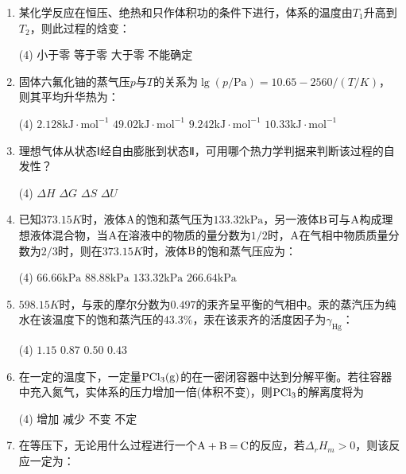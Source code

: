 \begin{enumerate}[label=\arabic*., itemsep=1.5ex]
    \item 某化学反应在恒压、绝热和只作体积功的条件下进行，体系的温度由$T_1$升高到$T_2$，则此过程的焓变：
    \begin{tasks}(4)
        \task 小于零
        \task 等于零
        \task 大于零
        \task 不能确定
    \end{tasks}
    \item 固体六氟化铀的蒸气压$p$与$T$的关系为$\lg(p/\mathrm{Pa})=10.65-2560/(T/K)$，则其平均升华热为：
    \begin{tasks}(4)
        \task $2.128\mathrm{kJ\cdot mol^{-1}}$
        \task $49.02\mathrm{kJ\cdot mol^{-1}}$
        \task $9.242\mathrm{kJ\cdot mol^{-1}}$
        \task $10.33\mathrm{kJ\cdot mol^{-1}}$
    \end{tasks}
    \item 理想气体从状态Ⅰ经自由膨胀到状态Ⅱ，可用哪个热力学判据来判断该过程的自发性？
    \begin{tasks}(4)
        \task $\Delta H$
        \task $\Delta G$
        \task $\Delta S$
        \task $\Delta U$
    \end{tasks}
    \item 已知$373.15K$时，液体$\ce{A}$的饱和蒸气压为$133.32\mathrm{kPa}$，另一液体$\ce{B}$可与$\ce{A}$构成理想液体混合物，当$\ce{A}$在溶液中的物质的量分数为$1/2$时，$\ce{A}$在气相中物质质量分数为$2/3$时，则在$373.15K$时，液体$\ce{B}$的饱和蒸气压应为：
    \begin{tasks}(4)
        \task $66.66\mathrm{kPa}$
        \task $88.88\mathrm{kPa}$
        \task $133.32\mathrm{kPa}$
        \task $266.64\mathrm{kPa}$
    \end{tasks}
    \item $598.15K$时，与汞的摩尔分数为$0.497$的汞齐呈平衡的气相中。汞的蒸汽压为纯水在该温度下的饱和蒸汽压的$43.3\%$，汞在该汞齐的活度因子为$\gamma_{\mathrm{Hg}}$：
    \begin{tasks}(4)
        \task $1.15$
        \task $0.87$
        \task $0.50$
        \task $0.43$
    \end{tasks}
    \item 在一定的温度下，一定量$\ce{PCl_{3}(g)}$的在一密闭容器中达到分解平衡。若往容器中充入氮气，实体系的压力增加一倍(体积不变)，则$\ce{PCl_{3}}$的解离度将为
    \begin{tasks}(4)
        \task 增加
        \task 减少
        \task 不变
        \task 不定
    \end{tasks}
    \item 在等压下，无论用什么过程进行一个$\ce{A + B = C}$的反应，若$\Delta_rH_m>0$，则该反应一定为：

\end{enumerate}
